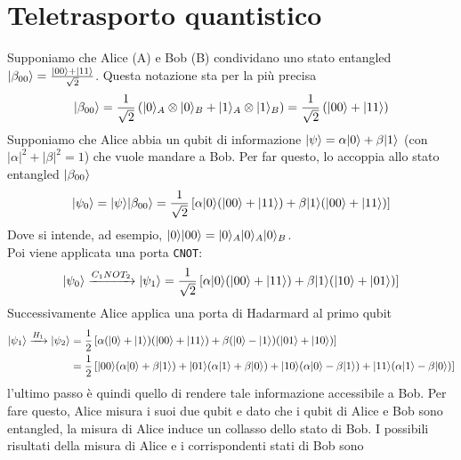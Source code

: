 \documentclass[12pt, a4paper]{report}
\begin{document}
\section{Teletrasporto quantistico}
Supponiamo che Alice (A) e Bob (B) condividano uno stato entangled $| \beta_{00} \rangle = \frac{| 00 \rangle+| 11 \rangle}{\sqrt{2}}$. Questa notazione sta per la più precisa
\begin{equation*}
    | \beta_{00} \rangle = \frac{1}{\sqrt{2}}\left(| 0 \rangle_{A}\otimes| 0 \rangle_{B}+| 1 \rangle_{A}\otimes| 1 \rangle_{B}\right) = \frac{1}{\sqrt{2}}\left(| 00 \rangle+| 11 \rangle\right)
\end{equation*}
Supponiamo che Alice abbia un qubit di informazione $| \psi \rangle = \alpha| 0 \rangle+\beta| 1 \rangle$ (con $\lvert \alpha \rvert^{2}+\lvert \beta \rvert^{2}=1$) che vuole mandare a Bob. Per far questo, lo accoppia allo stato entangled $| \beta_{00} \rangle$
\begin{equation*}
    | \psi_{0} \rangle = | \psi \rangle| \beta_{00} \rangle = \frac{1}{\sqrt{2}}\left[\alpha| 0 \rangle(| 00 \rangle+| 11 \rangle)+\beta| 1 \rangle(| 00 \rangle+| 11 \rangle)\right]
\end{equation*}
Dove si intende, ad esempio, $| 0 \rangle| 00 \rangle=| 0 \rangle_{A}| 0 \rangle_{A}| 0 \rangle_{B}$.\\
Poi viene applicata una porta \texttt{CNOT}:
\begin{equation*}
    | \psi_{0} \rangle \xrightarrow{C_{1}NOT_{2}} | \psi_{1} \rangle = \frac{1}{\sqrt{2}}\left[\alpha| 0 \rangle(| 00 \rangle+| 11 \rangle)+\beta| 1 \rangle(| 10 \rangle+| 01 \rangle)\right]
\end{equation*}
Successivamente Alice applica una porta di Hadarmard al primo qubit
\begin{equation*}
    \begin{split}
        | \psi_{1} \rangle \xrightarrow{H_{1}} | \psi_{2} \rangle& = \frac{1}{2}\left[\alpha(| 0 \rangle+| 1 \rangle)(| 00 \rangle+| 11 \rangle)+\beta(| 0 \rangle-| 1 \rangle)(| 01 \rangle+| 10 \rangle)\right] \\ &
        = \frac{1}{2}\left[| 00 \rangle(\alpha| 0 \rangle+\beta| 1 \rangle)+| 01 \rangle(\alpha| 1 \rangle+\beta| 0 \rangle)+| 10 \rangle(\alpha| 0 \rangle-\beta| 1 \rangle)+| 11 \rangle(\alpha| 1 \rangle-\beta| 0 \rangle)\right]
    \end{split}
\end{equation*}
l'ultimo passo è quindi quello di rendere tale informazione accessibile a Bob. Per fare questo, Alice misura i suoi due qubit e dato che i qubit di Alice e Bob sono entangled, la  misura di Alice induce un collasso dello stato di Bob. I possibili risultati della misura di Alice e i corrispondenti stati di Bob sono
\end{document}
